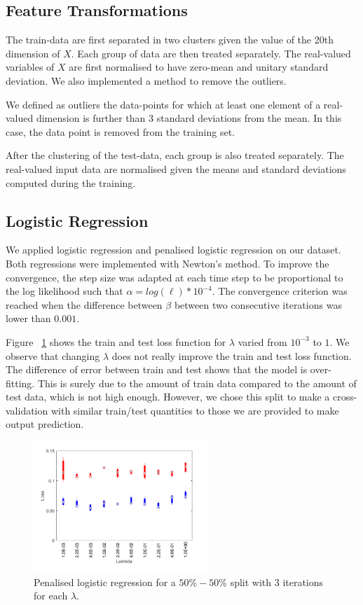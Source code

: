 \documentclass{article} %
\begin{document}
\subsection{Feature Transformations}
The train-data are first separated in two clusters given the value of the 20th dimension of $X$. Each group of data are then treated separately. The real-valued variables of $X$ are first normalised to have zero-mean and unitary standard deviation. We also implemented a method to remove the outliers.

We defined as outliers the data-points for which at least one element of a real-valued dimension is further than 3 standard deviations from the mean. In this case, the data point is removed from the training set. 

After the clustering of the test-data, each group is also treated separately. The real-valued input data are normalised given the means and standard deviations computed during the training.

\subsection{Logistic Regression}
We applied logistic regression and penalised logistic regression on our dataset. Both regressions were implemented with Newton's method. To improve the convergence, the step size was adapted at each time step to be proportional to the log likelihood such that $\alpha = log(\ell) * 10^{-4}$. The convergence criterion was reached when the difference between $\beta$ between two consecutive iterations was lower than $0.001$.

Figure ~\ref{fig:class_penLogistic} shows the train and test loss function for $\lambda$ varied from $10^{-3}$ to $1$. We observe that changing $\lambda$ does not really improve the train and test loss function. The difference of error between train and test shows that the model is over-fitting. This is surely due to the amount of train data compared to the amount of test data, which is not high enough. However, we chose this split to make a cross-validation with similar train/test quantities to those we are provided to make output prediction.

\begin{figure}[!h] %
	\center
	\includegraphics[width=2.6in]{figures/lambdaLossBox.png}
	\caption{Penalised logistic regression for a $50 \% - 50\%$ split with 3 iterations for each $\lambda$.}
	\label{fig:class_penLogistic}
\end{figure}
\end{document}
